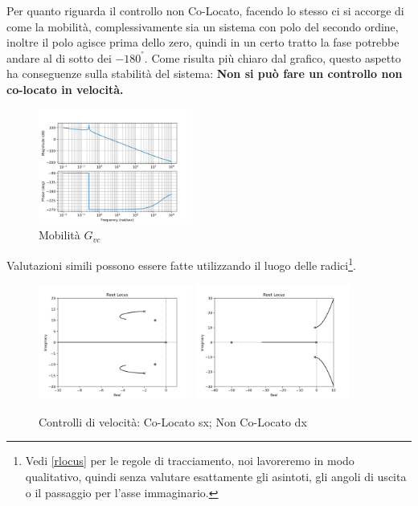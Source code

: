 Per quanto riguarda il controllo non Co-Locato, facendo lo stesso ci si accorge di come la mobilità, complessivamente sia un sistema con polo del secondo ordine, inoltre il polo agisce prima dello zero, quindi in un certo tratto la fase potrebbe andare al di sotto dei \(-180^°\). Come risulta più chiaro dal grafico, questo aspetto ha conseguenze sulla stabilità del sistema: \textbf{Non si può fare un controllo non co-locato in velocità.}

\begin{figure}[h]
    \centering
    \includegraphics[width=0.45\textwidth]{Immagini/mobilita_gvc.png}
    \caption{Mobilità \(G_{vc}\)}
\end{figure}

Valutazioni simili possono essere fatte utilizzando il luogo delle radici\footnote{Vedi \ref{rlocus} per le regole di tracciamento, noi lavoreremo in modo qualitativo, quindi senza valutare esattamente gli asintoti, gli angoli di uscita o il passaggio per l'asse immaginario.}.

\begin{figure}[h]
    \centering
    \includegraphics[width=0.45\textwidth]{Immagini/controllo_v_colocato.png}
    \includegraphics[width=0.45\textwidth]{Immagini/controllo_v_non_colocato.png}
    \caption{Controlli di velocità: Co-Locato sx; Non Co-Locato dx}
\end{figure}

